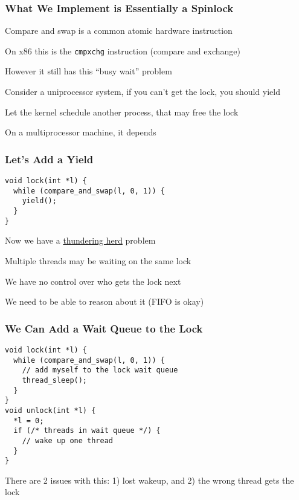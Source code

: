   \begin{frame}
    \frametitle{What We Implement is Essentially a Spinlock}

    Compare and swap is a common atomic hardware instruction

    \vspace{2em}

    On x86 this is the \texttt{cmpxchg} instruction (compare and exchange)

    \vspace{2em}

    However it still has this ``busy wait'' problem

    \vspace{2em}

    Consider a uniprocessor system, if you can't get the lock, you should yield

    \hspace{2em} Let the kernel schedule another process, that may free the lock

    \vspace{2em}

    On a multiprocessor machine, it depends
  \end{frame}

  \begin{frame}[fragile]
    \frametitle{Let's Add a Yield}

    \begin{lstlisting}
void lock(int *l) {
  while (compare_and_swap(l, 0, 1)) {
    yield();
  }
}
    \end{lstlisting}

    \vspace{2em}

    Now we have a 
    \href{https://en.wikipedia.org/wiki/Thundering_herd_problem}{thundering herd}
    problem

    \hspace{2em} Multiple threads may be waiting on the same lock

    \vspace{2em}

    We have no control over who gets the lock next

    \hspace{2em} We need to be able to reason about it (FIFO is okay)
  \end{frame}

  \begin{frame}[fragile]
    \frametitle{We Can Add a Wait Queue to the Lock}

    \begin{lstlisting}
void lock(int *l) {
  while (compare_and_swap(l, 0, 1)) {
    // add myself to the lock wait queue
    thread_sleep();
  }
}
void unlock(int *l) {
  *l = 0;
  if (/* threads in wait queue */) {
    // wake up one thread
  }
}
    \end{lstlisting}

    There are 2 issues with this: 1) lost wakeup, and 2) the wrong thread gets
    the lock
  \end{frame}


